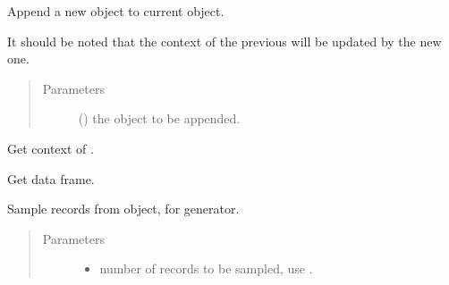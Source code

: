 \documentclass[letterpaper,10pt,english]{sphinxmanual}
\begin{document}
\begin{fulllineitems}

\begin{fulllineitems}
\label{\detokenize{matchzoo:matchzoo.datapack.DataPack.append}}
Append a new  object to current  object.

It should be noted that the context of the previous 
will be updated by the new one.
\begin{quote}\begin{description}
\item[{Parameters}] \leavevmode
{} ({\hyperref[\detokenize{matchzoo:matchzoo.datapack.DataPack}]{}}) \textendash{} the  object to be appended.

\end{description}\end{quote}

\end{fulllineitems}


\begin{fulllineitems}
\label{\detokenize{matchzoo:matchzoo.datapack.DataPack.context}}
Get context of .

\end{fulllineitems}


\begin{fulllineitems}
\label{\detokenize{matchzoo:matchzoo.datapack.DataPack.dataframe}}
Get data frame.

\end{fulllineitems}


\begin{fulllineitems}
\label{\detokenize{matchzoo:matchzoo.datapack.DataPack.sample}}
Sample records from  object, for generator.
\begin{quote}\begin{description}
\item[{Parameters}] \leavevmode\begin{itemize}
\item {} 
 \textendash{} number of records to be sampled, use .


\end{itemize}
\end{description}
\end{quote}
\end{fulllineitems}
\end{fulllineitems}
\end{document}

